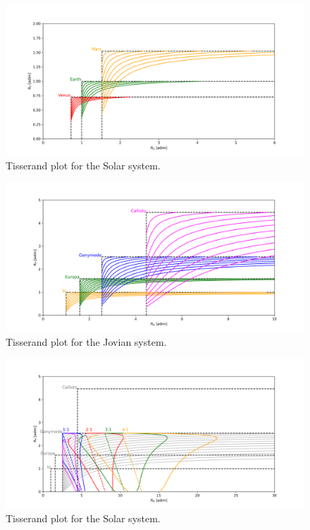 \documentclass{article}
\begin{document}
\newpage
\begin{figure}[!htbp]
    \centering
    \includegraphics[width=\linewidth]{tisserand_solar.png}
    \caption{Tisserand plot for the Solar system.}
    \label{fig:tisserand_solar}
\end{figure}

\begin{figure}[!htbp]
    \centering
    \includegraphics[width=\linewidth]{tisserand_jovian.png}
    \caption{Tisserand plot for the Jovian system.}
    \label{fig:tisserand_jovian}
\end{figure}


\begin{figure}[!htbp]
    \centering
    \includegraphics[width=\linewidth]{Figures/tisserand_jovian_resonance.png}
    \caption{Tisserand plot for the Solar system.}
    \label{fig:tisserand_jovian_resonance}
\end{figure}
\end{document}
